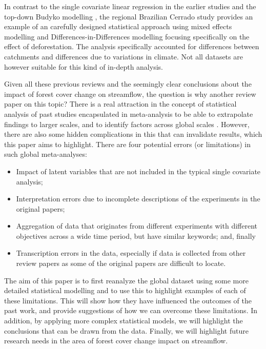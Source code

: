 \documentclass[]{elsarticle} %
\providecommand{\tightlist}{%
  \setlength{\itemsep}{0pt}\setlength{\parskip}{0pt}}
\begin{document}
In contrast to the single covariate linear regression in the earlier studies \citep{zhang2017, filoso2017} and the top-down Budyko modelling \citep{zhou2015, hoekvandijke2022}, the regional Brazilian Cerrado study \citep{levy2018} provides an example of an carefully designed statistical approach using mixed effects modelling and Differences-in-Differences modelling focusing specifically on the effect of deforestation. The analysis specifically accounted for differences between catchments and differences due to variations in climate. Not all datasets are however suitable for this kind of in-depth analysis.

Given all these previous reviews and the seemingly clear conclusions about the impact of forest cover change on streamflow, the question is why another review paper on this topic?
There is a real attraction in the concept of statistical analysis of past studies encapsulated in meta-analysis to be able to extrapolate findings to larger scales, and to identify factors across global scales \citep{evaristo2020metaanalysis}.
However, there are also some hidden complications in this that can invalidate results, which this paper aims to highlight. There are four potential errors (or limitations) in such global meta-analyses:

\begin{itemize}
\tightlist
\item
  Impact of latent variables that are not included in the typical single covariate analysis;
\item
  Interpretation errors due to incomplete descriptions of the experiments in the original papers;
\item
  Aggregation of data that originates from different experiments with different objectives across a wide time period, but have similar keywords; and, finally
\item
  Transcription errors in the data, especially if data is collected from other review papers as some of the original papers are difficult to locate.
\end{itemize}

The aim of this paper is to first reanalyze the global dataset \citep{zhang2017, filoso2017} using some more detailed statistical modelling and to use this to highlight examples of each of these limitations. This will show how they have influenced the outcomes of the past work, and provide suggestions of how we can overcome these limitations. In addition, by applying more complex statistical models, we will highlight the conclusions that can be drawn from the data. Finally, we will highlight future research needs in the area of forest cover change impact on streamflow.
\end{document}
